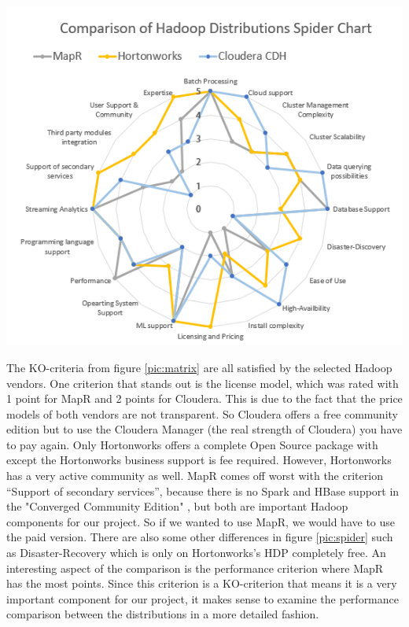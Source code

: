 \documentclass[12pt]{article}
\begin{document}
\begin{center}
\includegraphics[width=1.0\textwidth]{img/spider}
\label{pic:spider}
\end{center}
The KO-criteria from figure \ref{pic:matrix} are all satisfied by the selected Hadoop vendors. One criterion that stands out is the license model, which was rated with 1 point for MapR and 2 points for Cloudera. This is due to the fact that the price models of both vendors are not transparent. So Cloudera offers a free community edition but to use the Cloudera Manager (the real strength of Cloudera) you have to pay again. Only Hortonworks offers a complete Open Source package with except the Hortonworks business support is fee required. However, Hortonworks has a very active community as well. MapR comes off worst with the criterion “Support of secondary services”, because there is no Spark and
HBase support in the "Converged Community Edition" \citep{MapR2018b}, but both are important Hadoop components for our project. So if we wanted to use MapR, we would have to use the paid version. There are also some other differences in figure \ref{pic:spider} such as Disaster-Recovery which is only on Hortonworks’s HDP completely free. An interesting aspect of the comparison is the performance criterion where MapR has the most points. Since this criterion is a KO-criterion that means it is a very important component for our project, it makes sense to examine the performance comparison between the distributions in a more detailed fashion.
\end{document}
